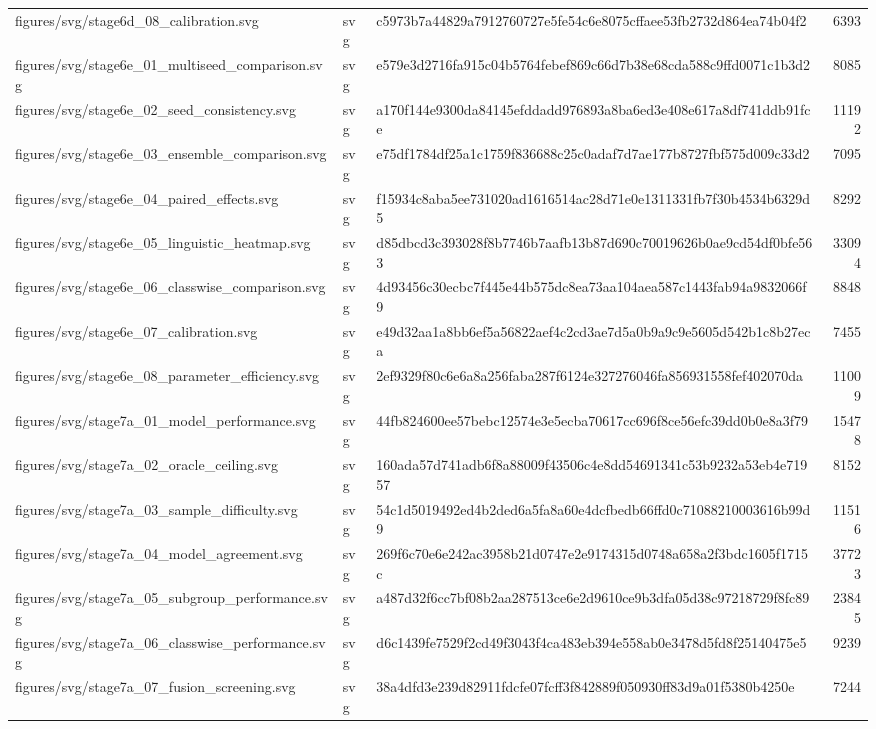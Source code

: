 \begin{tabular}{lllr}
figures/svg/stage6d_08_calibration.svg & svg & c5973b7a44829a7912760727e5fe54c6e8075cffaee53fb2732d864ea74b04f2 & 6393 \\
figures/svg/stage6e_01_multiseed_comparison.svg & svg & e579e3d2716fa915c04b5764febef869c66d7b38e68cda588c9ffd0071c1b3d2 & 8085 \\
figures/svg/stage6e_02_seed_consistency.svg & svg & a170f144e9300da84145efddadd976893a8ba6ed3e408e617a8df741ddb91fce & 11192 \\
figures/svg/stage6e_03_ensemble_comparison.svg & svg & e75df1784df25a1c1759f836688c25c0adaf7d7ae177b8727fbf575d009c33d2 & 7095 \\
figures/svg/stage6e_04_paired_effects.svg & svg & f15934c8aba5ee731020ad1616514ac28d71e0e1311331fb7f30b4534b6329d5 & 8292 \\
figures/svg/stage6e_05_linguistic_heatmap.svg & svg & d85dbcd3c393028f8b7746b7aafb13b87d690c70019626b0ae9cd54df0bfe563 & 33094 \\
figures/svg/stage6e_06_classwise_comparison.svg & svg & 4d93456c30ecbc7f445e44b575dc8ea73aa104aea587c1443fab94a9832066f9 & 8848 \\
figures/svg/stage6e_07_calibration.svg & svg & e49d32aa1a8bb6ef5a56822aef4c2cd3ae7d5a0b9a9c9e5605d542b1c8b27eca & 7455 \\
figures/svg/stage6e_08_parameter_efficiency.svg & svg & 2ef9329f80c6e6a8a256faba287f6124e327276046fa856931558fef402070da & 11009 \\
figures/svg/stage7a_01_model_performance.svg & svg & 44fb824600ee57bebc12574e3e5ecba70617cc696f8ce56efc39dd0b0e8a3f79 & 15478 \\
figures/svg/stage7a_02_oracle_ceiling.svg & svg & 160ada57d741adb6f8a88009f43506c4e8dd54691341c53b9232a53eb4e71957 & 8152 \\
figures/svg/stage7a_03_sample_difficulty.svg & svg & 54c1d5019492ed4b2ded6a5fa8a60e4dcfbedb66ffd0c71088210003616b99d9 & 11516 \\
figures/svg/stage7a_04_model_agreement.svg & svg & 269f6c70e6e242ac3958b21d0747e2e9174315d0748a658a2f3bdc1605f1715c & 37723 \\
figures/svg/stage7a_05_subgroup_performance.svg & svg & a487d32f6cc7bf08b2aa287513ce6e2d9610ce9b3dfa05d38c97218729f8fc89 & 23845 \\
figures/svg/stage7a_06_classwise_performance.svg & svg & d6c1439fe7529f2cd49f3043f4ca483eb394e558ab0e3478d5fd8f25140475e5 & 9239 \\
figures/svg/stage7a_07_fusion_screening.svg & svg & 38a4dfd3e239d82911fdcfe07fcff3f842889f050930ff83d9a01f5380b4250e & 7244 \\

\end{tabular}

